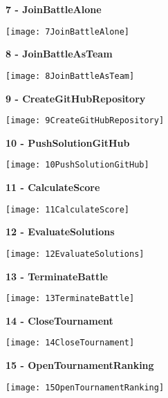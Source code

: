 \begin{minipage}{\textwidth}
	\textbf{7 - JoinBattleAlone}
	\begin{center}
		\texttt{[image: 7JoinBattleAlone]}
	\end{center}

\vspace{1cm}

	\textbf{8 - JoinBattleAsTeam}
	\begin{center}
		\texttt{[image: 8JoinBattleAsTeam]}
	\end{center}
\end{minipage}

\begin{minipage}{\textwidth}
	\textbf{9 - CreateGitHubRepository}
	\begin{center}
		\texttt{[image: 9CreateGitHubRepository]}
	\end{center}

\vspace{1cm}

	\textbf{10 - PushSolutionGitHub}
	\begin{center}
		\texttt{[image: 10PushSolutionGitHub]}
	\end{center}
\end{minipage}

\begin{minipage}{\textwidth}
	\textbf{11 - CalculateScore}
	\begin{center}
		\texttt{[image: 11CalculateScore]}
	\end{center}

\vspace{1cm}

	\textbf{12 - EvaluateSolutions}
	\begin{center}
		\texttt{[image: 12EvaluateSolutions]}
	\end{center}
\end{minipage}

\begin{minipage}{\textwidth}
	\textbf{13 - TerminateBattle}
	\begin{center}
		\texttt{[image: 13TerminateBattle]}
	\end{center}
\end{minipage}

\begin{minipage}{\textwidth}
	\textbf{14 - CloseTournament}
	\begin{center}
		\texttt{[image: 14CloseTournament]}
	\end{center}

\vspace*{1cm}

	\textbf{15 - OpenTournamentRanking}
	\begin{center}
		\texttt{[image: 15OpenTournamentRanking]}
	\end{center}
\end{minipage}

